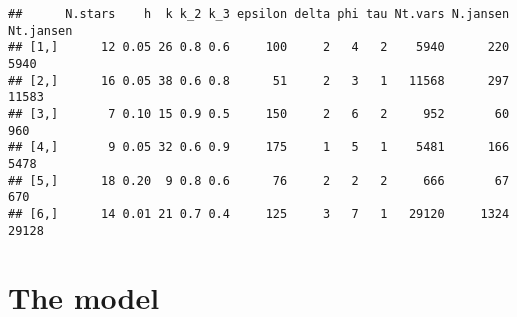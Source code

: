 \documentclass[11pt,]{article}
\begin{document}
\begin{verbatim}
##      N.stars    h  k k_2 k_3 epsilon delta phi tau Nt.vars N.jansen Nt.jansen
## [1,]      12 0.05 26 0.8 0.6     100     2   4   2    5940      220      5940
## [2,]      16 0.05 38 0.6 0.8      51     2   3   1   11568      297     11583
## [3,]       7 0.10 15 0.9 0.5     150     2   6   2     952       60       960
## [4,]       9 0.05 32 0.6 0.9     175     1   5   1    5481      166      5478
## [5,]      18 0.20  9 0.8 0.6      76     2   2   2     666       67       670
## [6,]      14 0.01 21 0.7 0.4     125     3   7   1   29120     1324     29128
\end{verbatim}

\hypertarget{the-model}{%
\section{The model}\label{the-model}}
\end{document}

